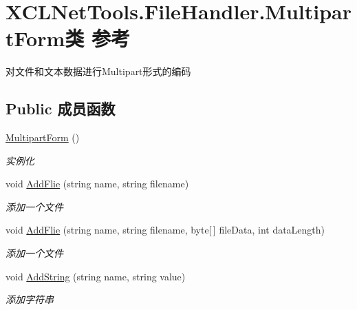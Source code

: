 \hypertarget{class_x_c_l_net_tools_1_1_file_handler_1_1_multipart_form}{}\section{X\+C\+L\+Net\+Tools.\+File\+Handler.\+Multipart\+Form类 参考}
\label{class_x_c_l_net_tools_1_1_file_handler_1_1_multipart_form}


对文件和文本数据进行\+Multipart形式的编码  


\subsection*{Public 成员函数}
\begin{DoxyCompactItemize}
\item 
\hyperlink{class_x_c_l_net_tools_1_1_file_handler_1_1_multipart_form_ab1d1debcf1e0f5dc05e9758f72b4500d}{Multipart\+Form} ()
\begin{DoxyCompactList}\small\item\em 实例化 \end{DoxyCompactList}\item 
void \hyperlink{class_x_c_l_net_tools_1_1_file_handler_1_1_multipart_form_af2601517bb4cafc5c9648945ed3e5572}{Add\+Flie} (string name, string filename)
\begin{DoxyCompactList}\small\item\em 添加一个文件 \end{DoxyCompactList}\item 
void \hyperlink{class_x_c_l_net_tools_1_1_file_handler_1_1_multipart_form_a5b531d40e9baf9f5ca51260bd4403b00}{Add\+Flie} (string name, string filename, byte\mbox{[}$\,$\mbox{]} file\+Data, int data\+Length)
\begin{DoxyCompactList}\small\item\em 添加一个文件 \end{DoxyCompactList}\item 
void \hyperlink{class_x_c_l_net_tools_1_1_file_handler_1_1_multipart_form_ab791aa6797ff7253f448fbad17ec0841}{Add\+String} (string name, string value)
\begin{DoxyCompactList}\small\item\em 添加字符串 \end{DoxyCompactList}\end{DoxyCompactItemize}
